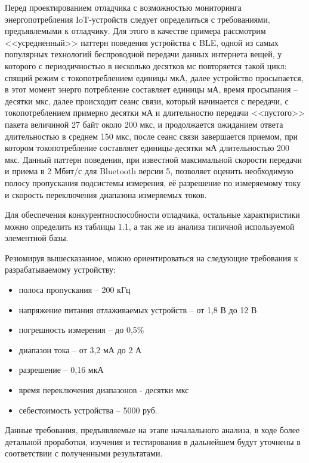 Перед проектированием отладчика с возможностью мониторинга энергопотребления IoT-устройств
следует определиться с требованиями, предъявлемыми к отладчику. 
Для этого в качестве примера рассмотрим <<усредненный>> паттерн поведения устройства с BLE, одной
из самых популярных технологий беспроводной передачи данных интернета вещей, 
у которого с периодичностью в несколько десятков мс повторяется такой цикл: спящий режим 
с токопотреблением единицы мкА, далее устройство просыпается, в этот момент
энерго потребление составляет единицы мА, время просыпания -- десятки мкс, далее происходит
сеанс связи, который начинается с передачи, с токопотреблением примерно десятки мА 
и длительностю передачи <<пустого>> пакета величиной 27 байт около 200 мкс, и продолжается 
ожиданием ответа длительностью в среднем 150 мкс, после сеанс связи завершается приемом,
при котором токопотребление составляет единицы-десятки мА длительностью 200 мкс.
Данный паттерн поведения, при известной максимальной скорости передачи и приема в 2 Мбит/с для 
Bluetooth версии 5, позволяет оценить необходимую полосу пропускания подсистемы измерения,
её разрешение по измеряемому току и скорость переключения диапазона измеряемых токов. 

Для обеспечения конкурентноспособности отладчика, остальные характиристики можно определить 
из таблицы 1.1, а так же из анализа типичной используемой элементной базы.


Резюмируя вышесказанное, можно ориентироваться на следующие требования к разрабатываемому 
устройству:
\begin{itemize}
    \item полоса пропускания -- 200 кГц
    \item напряжение питания отлаживаемых устройств -- от 1,8 В до 12 В
    \item погрешность измерения -- до 0,5\%
    \item диапазон тока -- от 3,2 мА до 2 А
    \item разрешение -- 0,16 мкА
    \item время переключения диапазонов - десятки мкс
    \item себестоимость устройства -- 5000 руб.
\end{itemize}

Данные требования, предъявляемые на этапе началального анализа, в ходе более детальной проработки,
изучения и тестирования в дальнейшем будут уточнены в соответствии с полученными результатами.
